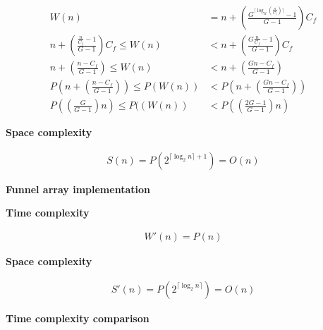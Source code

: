 \documentclass{article}
\newcommand{\funarrayimpl}{\textbf{Funnel array implementation}}
\newcommand{\tcomplex}{\textbf{Time complexity}}
\newcommand{\scomplex}{\textbf{Space complexity}}
\newcommand{\tcomplexcmp}{\textbf{Time complexity comparison}}
\newcommand{\spacefn}{S}
\newcommand{\nwritesfn}{W}
\newcommand{\spacenewfn}{\spacefn'}
\newcommand{\nwritesnewfn}{\nwritesfn'}
\newcommand{\bigo}{O}
\newcommand{\biggo}{P}
\newcommand{\varnitems}{n}
\newcommand{\initcapacity}{C_f}
\newcommand{\growthfactor}{G}
\begin{document}
	\begin{align*}
	\nwritesfn(\varnitems) &= \varnitems + \left( \frac{\growthfactor^{\big\lceil \log_{\growthfactor} \left( \frac {\varnitems} {\initcapacity} \right) \big\rceil} - 1}{\growthfactor - 1} \right) \initcapacity\\
	\varnitems + \left( \frac{\frac{\varnitems}{\initcapacity} - 1}{\growthfactor - 1} \right) \initcapacity \leq \nwritesfn(\varnitems) &< \varnitems + \left( \frac{\growthfactor\frac{\varnitems}{\initcapacity} - 1}{\growthfactor - 1} \right) \initcapacity\\
	\varnitems + \left( \frac{\varnitems - \initcapacity}{\growthfactor - 1} \right) \leq \nwritesfn(\varnitems) &< \varnitems + \left( \frac{\growthfactor\varnitems - \initcapacity}{\growthfactor - 1} \right)\\
	\biggo\left( \varnitems + \left( \frac{\varnitems - \initcapacity}{\growthfactor - 1} \right) \right) \leq \biggo\left( \nwritesfn(\varnitems) \right) &< \biggo\left( \varnitems + \left( \frac{\growthfactor\varnitems - \initcapacity}{\growthfactor - 1} \right) \right)\\
	\biggo\left( \left( \frac{\growthfactor}{\growthfactor - 1} \right) \varnitems \right) \leq \biggo(\left( \nwritesfn(\varnitems) \right) &< \biggo\left( \left( \frac{2\growthfactor - 1}{\growthfactor - 1} \right) \varnitems \right)
	\end{align*}
	
	\scomplex
	
	\begin{align*}
	\spacefn(\varnitems) = \biggo(2^{\lceil \log_2 \varnitems \rceil + 1}) = \bigo(\varnitems)
	\end{align*}
	
	\funarrayimpl
	
	\tcomplex
	
	\begin{align*}
	\nwritesnewfn(\varnitems) = \biggo(\varnitems)
	\end{align*}
	
	\scomplex
	
	\begin{align*}
	\spacenewfn(\varnitems) = \biggo(2^{\lceil \log_2 \varnitems \rceil}) = \bigo(\varnitems)
	\end{align*}
	
	\tcomplexcmp
	
	\begin{align*}
	\end{align*}
	
\end{document}
